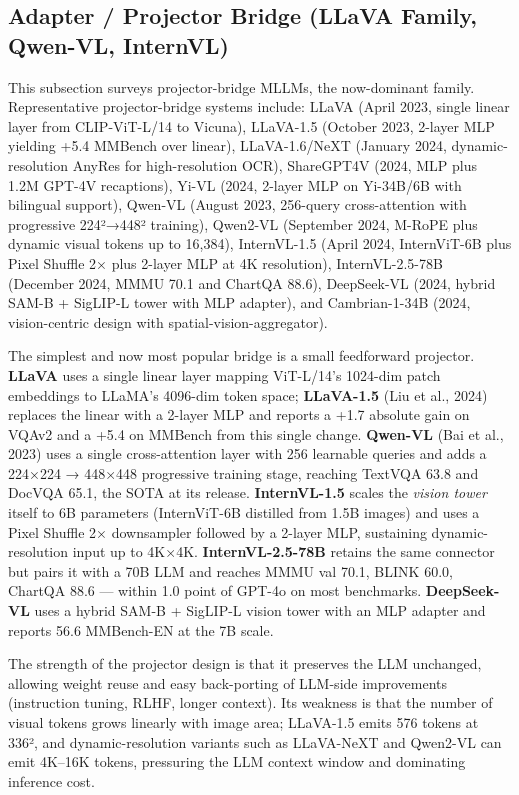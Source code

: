 \subsection{Adapter / Projector Bridge (LLaVA Family, Qwen-VL, InternVL)}\label{adapter-projector-bridge-llava-family-qwen-vl-internvl}

This subsection surveys projector-bridge MLLMs, the now-dominant family. Representative projector-bridge systems include: LLaVA (April 2023, single linear layer from CLIP-ViT-L/14 to Vicuna), LLaVA-1.5 (October 2023, 2-layer MLP yielding +5.4 MMBench over linear), LLaVA-1.6/NeXT (January 2024, dynamic-resolution AnyRes for high-resolution OCR), ShareGPT4V (2024, MLP plus 1.2M GPT-4V recaptions), Yi-VL (2024, 2-layer MLP on Yi-34B/6B with bilingual support), Qwen-VL (August 2023, 256-query cross-attention with progressive 224²→448² training), Qwen2-VL (September 2024, M-RoPE plus dynamic visual tokens up to 16,384), InternVL-1.5 (April 2024, InternViT-6B plus Pixel Shuffle 2× plus 2-layer MLP at 4K resolution), InternVL-2.5-78B (December 2024, MMMU 70.1 and ChartQA 88.6), DeepSeek-VL (2024, hybrid SAM-B + SigLIP-L tower with MLP adapter), and Cambrian-1-34B (2024, vision-centric design with spatial-vision-aggregator).

The simplest and now most popular bridge is a small feedforward projector. \textbf{LLaVA} uses a single linear layer mapping ViT-L/14's 1024-dim patch embeddings to LLaMA's 4096-dim token space; \textbf{LLaVA-1.5} (Liu et al., 2024) replaces the linear with a 2-layer MLP and reports a +1.7 absolute gain on VQAv2 and a +5.4 on MMBench from this single change. \textbf{Qwen-VL} (Bai et al., 2023) uses a single cross-attention layer with 256 learnable queries and adds a 224×224 → 448×448 progressive training stage, reaching TextVQA 63.8 and DocVQA 65.1, the SOTA at its release. \textbf{InternVL-1.5} scales the \emph{vision tower} itself to 6B parameters (InternViT-6B distilled from 1.5B images) and uses a Pixel Shuffle 2× downsampler followed by a 2-layer MLP, sustaining dynamic-resolution input up to 4K×4K. \textbf{InternVL-2.5-78B} retains the same connector but pairs it with a 70B LLM and reaches MMMU val 70.1, BLINK 60.0, ChartQA 88.6 --- within 1.0 point of GPT-4o on most benchmarks. \textbf{DeepSeek-VL} uses a hybrid SAM-B + SigLIP-L vision tower with an MLP adapter and reports 56.6 MMBench-EN at the 7B scale.

The strength of the projector design is that it preserves the LLM unchanged, allowing weight reuse and easy back-porting of LLM-side improvements (instruction tuning, RLHF, longer context). Its weakness is that the number of visual tokens grows linearly with image area; LLaVA-1.5 emits 576 tokens at 336², and dynamic-resolution variants such as LLaVA-NeXT and Qwen2-VL can emit 4K--16K tokens, pressuring the LLM context window and dominating inference cost.

